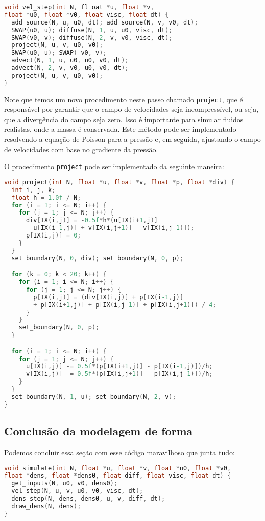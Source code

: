 \begin{lstlisting}[language=C]
void vel_step(int N, fl oat *u, float *v, 
float *u0, float *v0, float visc, float dt) {
  add_source(N, u, u0, dt); add_source(N, v, v0, dt);
  SWAP(u0, u); diffuse(N, 1, u, u0, visc, dt);
  SWAP(v0, v); diffuse(N, 2, v, v0, visc, dt);
  project(N, u, v, u0, v0);
  SWAP(u0, u); SWAP( v0, v);
  advect(N, 1, u, u0, u0, v0, dt);
  advect(N, 2, v, v0, u0, v0, dt);
  project(N, u, v, u0, v0);
}
\end{lstlisting}

Note que temos um novo procedimento neste passo chamado \texttt{project}, que é responsável por garantir que o campo de velocidades seja incompressível, ou seja, que a divergência do campo seja zero. Isso é importante para simular fluidos realistas, onde a massa é conservada. Este método pode ser implementado resolvendo a equação de Poisson para a pressão e, em seguida, ajustando o campo de velocidades com base no gradiente da pressão.

O procedimento \texttt{project} pode ser implementado da seguinte maneira:
\begin{lstlisting}[language=C]
void project(int N, float *u, float *v, float *p, float *div) {
  int i, j, k;
  float h = 1.0f / N;
  for (i = 1; i <= N; i++) {
    for (j = 1; j <= N; j++) {
      div[IX(i,j)] = -0.5f*h*(u[IX(i+1,j)]
      - u[IX(i-1,j)] + v[IX(i,j+1)] - v[IX(i,j-1)]);
      p[IX(i,j)] = 0;
    }
  }
  set_boundary(N, 0, div); set_boundary(N, 0, p);

  for (k = 0; k < 20; k++) {
    for (i = 1; i <= N; i++) {
      for (j = 1; j <= N; j++) {
        p[IX(i,j)] = (div[IX(i,j)] + p[IX(i-1,j)]
        + p[IX(i+1,j)] + p[IX(i,j-1)] + p[IX(i,j+1)]) / 4;
      }
    }
    set_boundary(N, 0, p);
  }

  for (i = 1; i <= N; i++) {
    for (j = 1; j <= N; j++) {
      u[IX(i,j)] -= 0.5f*(p[IX(i+1,j)] - p[IX(i-1,j)])/h;
      v[IX(i,j)] -= 0.5f*(p[IX(i,j+1)] - p[IX(i,j-1)])/h;
    }
  }
  set_boundary(N, 1, u); set_boundary(N, 2, v);
}
\end{lstlisting}

\subsection{Conclusão da modelagem de forma}
Podemos concluir essa seção com esse código maravilhoso que junta tudo:

\begin{lstlisting}[language=C]
void simulate(int N, float *u, float *v, float *u0, float *v0,
float *dens, float *dens0, float diff, float visc, float dt) {
  get_inputs(N, u0, v0, dens0);
  vel_step(N, u, v, u0, v0, visc, dt);
  dens_step(N, dens, dens0, u, v, diff, dt);
  draw_dens(N, dens);
}
\end{lstlisting}

